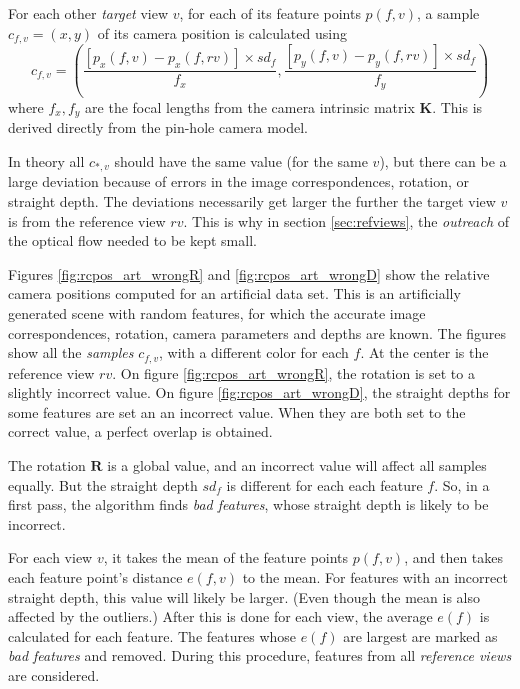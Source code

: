 \documentclass[11pt]{scrreprt}
\newcommand{\matr}[1]{\mathbf{#1}}
\begin{document}
For each other \emph{target} view $v$, for each of its feature points $p(f,v)$, a sample $c_{f,v} = (x, y)$ of its camera position is calculated using
\begin{equation*}
c_{f,v} = \left( \frac{\left[p_x(f,v) - p_x(f,rv)\right] \times sd_f}{f_x}, \frac{\left[p_y(f,v) - p_y(f,rv)\right] \times sd_f}{f_y} \right)
\end{equation*}
where $f_x, f_y$ are the focal lengths from the camera intrinsic matrix $\matr{K}$. This is derived directly from the pin-hole camera model.

In theory all $c_{*,v}$ should have the same value (for the same $v$), but there can be a large deviation because of errors in the image correspondences, rotation, or straight depth. The deviations necessarily get larger the further the target view $v$ is from the reference view $rv$. This is why in section \ref{sec:refviews}, the \emph{outreach} of the optical flow needed to be kept small.

Figures \ref{fig:rcpos_art_wrongR} and \ref{fig:rcpos_art_wrongD} show the relative camera positions computed for an artificial data set. This is an artificially generated scene with random features, for which the accurate image correspondences, rotation, camera parameters and depths are known. The figures show all the \emph{samples} $c_{f,v}$, with a different color for each $f$. At the center is the reference view $rv$. On figure \ref{fig:rcpos_art_wrongR}, the rotation is set to a slightly incorrect value. On figure \ref{fig:rcpos_art_wrongD}, the straight depths for some features are set an an incorrect value. When they are both set to the correct value, a perfect overlap is obtained.

The rotation $\matr{R}$ is a global value, and an incorrect value will affect all samples equally. But the straight depth $sd_f$ is different for each each feature $f$. So, in a first pass, the algorithm finds \emph{bad features}, whose straight depth is likely to be incorrect.

For each view $v$, it takes the mean of the feature points $p(f,v)$, and then takes each feature point's distance $e(f,v)$ to the mean. For features with an incorrect straight depth, this value will likely be larger. (Even though the mean is also affected by the outliers.) After this is done for each view, the average $e(f)$ is calculated for each feature. The features whose $e(f)$ are largest are marked as \emph{bad features} and removed. During this procedure, features from all \emph{reference views} are considered.
\end{document}
